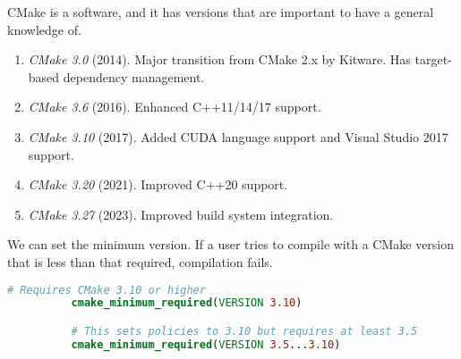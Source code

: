\documentclass{article}
\begin{document}
      \begin{definition}[Version]
        CMake is a software, and it has versions that are important to have a general knowledge of. 
        \begin{enumerate}
          \item \textit{CMake 3.0} (2014). Major transition from CMake 2.x by Kitware. Has target-based dependency management. 
          \item \textit{CMake 3.6} (2016). Enhanced C++11/14/17 support. 
          \item \textit{CMake 3.10} (2017). Added CUDA language support and Visual Studio 2017 support. 
          \item \textit{CMake 3.20} (2021). Improved C++20 support. 
          \item \textit{CMake 3.27} (2023). Improved build system integration. 
        \end{enumerate}
        We can set the minimum version. If a user tries to compile with a CMake version that is less than that required, compilation fails. 
        \begin{lstlisting}[language=CMake]
          # Requires CMake 3.10 or higher 
          cmake_minimum_required(VERSION 3.10)  

          # This sets policies to 3.10 but requires at least 3.5
          cmake_minimum_required(VERSION 3.5...3.10)
        \end{lstlisting}
      \end{definition} 
\end{document}
